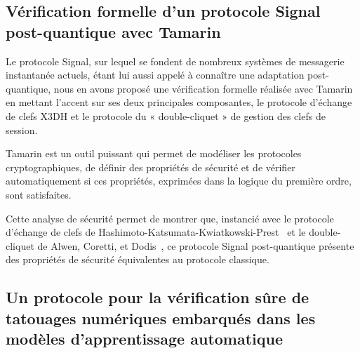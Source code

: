 \subsection[Second article]{Vérification formelle d’un protocole Signal post-quantique avec Tamarin~\cite{BCRS}} %
\label{sub:paper_2}
Le protocole Signal, sur lequel se fondent de nombreux systèmes de messagerie instantanée actuels, étant lui aussi appelé
à connaître une adaptation post-quantique, nous en avons proposé une vérification formelle réalisée avec
Tamarin en mettant l’accent sur ses deux principales composantes, le protocole d’échange de clefs X3DH et le protocole
du « double-cliquet » de gestion des clefs de session.\par
Tamarin est un outil puissant qui permet de modéliser les protocoles cryptographiques, de définir des propriétés de sécurité et de vérifier automatiquement si ces propriétés, exprimées dans la logique du première ordre, sont satisfaites.\par
Cette analyse de sécurité permet de montrer que, instancié avec le protocole d’échange de clefs de Hashimoto-Katsumata-Kwiatkowski-Prest~\cite{PKC:HKKP21} et le double-cliquet de Alwen, Coretti, et Dodis~\cite{EC:AlwCorDod19}, ce protocole Signal post-quantique présente des propriétés de sécurité équivalentes au protocole classique.


\subsection[Troisième article]{Un protocole pour la vérification sûre de tatouages numériques embarqués dans les modèles d’apprentissage automatique~\cite{IHMMSec:KTBBS21}} %
\label{sub:paper_3}

\lipsum[34-35]


